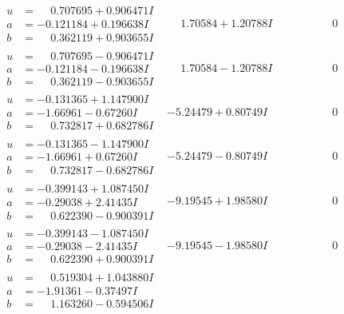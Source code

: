 \documentclass[1p]{elsarticle_modified}
\theoremstyle{definition}
\begin{document}
$$\begin{array}{c|c|c}
 \hline 
\begin{aligned}
u &= \phantom{-}0.707695 + 0.906471 I \\
a &= -0.121184 + 0.196638 I \\
b &= \phantom{-}0.362119 + 0.903655 I\end{aligned}
 & \phantom{-}1.70584 + 1.20788 I & \phantom{-0.000000 } 0 \\ \hline\begin{aligned}
u &= \phantom{-}0.707695 - 0.906471 I \\
a &= -0.121184 - 0.196638 I \\
b &= \phantom{-}0.362119 - 0.903655 I\end{aligned}
 & \phantom{-}1.70584 - 1.20788 I & \phantom{-0.000000 } 0 \\ \hline\begin{aligned}
u &= -0.131365 + 1.147900 I \\
a &= -1.66961 - 0.67260 I \\
b &= \phantom{-}0.732817 + 0.682786 I\end{aligned}
 & -5.24479 + 0.80749 I & \phantom{-0.000000 } 0 \\ \hline\begin{aligned}
u &= -0.131365 - 1.147900 I \\
a &= -1.66961 + 0.67260 I \\
b &= \phantom{-}0.732817 - 0.682786 I\end{aligned}
 & -5.24479 - 0.80749 I & \phantom{-0.000000 } 0 \\ \hline\begin{aligned}
u &= -0.399143 + 1.087450 I \\
a &= -0.29038 + 2.41435 I \\
b &= \phantom{-}0.622390 - 0.900391 I\end{aligned}
 & -9.19545 + 1.98580 I & \phantom{-0.000000 } 0 \\ \hline\begin{aligned}
u &= -0.399143 - 1.087450 I \\
a &= -0.29038 - 2.41435 I \\
b &= \phantom{-}0.622390 + 0.900391 I\end{aligned}
 & -9.19545 - 1.98580 I & \phantom{-0.000000 } 0 \\ \hline\begin{aligned}
u &= \phantom{-}0.519304 + 1.043880 I \\
a &= -1.91361 - 0.37497 I \\
b &= \phantom{-}1.163260 - 0.594506 I\end{aligned}

\end{array}$$
\end{document}
